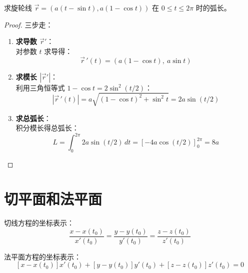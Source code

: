 \documentclass[lang=cn,10pt,thmcnt=section]{elegantbook}
\begin{document}
	\begin{example}
		求旋轮线 $\vec{r} = (a(t - \sin t), a(1 - \cos t))$ 在 $0 \leq t \leq 2\pi$ 时的弧长。
	\end{example}
	\begin{proof}
	三步走：
	\begin{enumerate}
		\item \textbf{求导数 $\overrightarrow{r} '$}：\\
		对参数 $t$ 求导得：
		\[
			\vec{r}\,'(t) = \left( a(1 - \cos t),\ a\sin t \right)
		\]
		
		\item \textbf{求模长 $\left\lvert \overrightarrow{r} '\right\rvert $}：\\
		利用三角恒等式 $1 - \cos t = 2\sin^2(t/2)$：
		\[
			\left\lvert \vec{r}\,'(t) \right\rvert = a\sqrt{(1 - \cos t)^2 + \sin^2 t} = 2a \sin(t/2)
		\]
		
		\item \textbf{求总弧长}：\\
		积分模长得总弧长：
		\[
			L = \int_{0}^{2\pi} 2a \sin(t/2) \,dt = \left[ -4a \cos(t/2) \right]_{0}^{2\pi} = 8a
		\]
	\end{enumerate}
\end{proof}

\section{切平面和法平面}
切线方程的坐标表示：
\[
\frac{x - x(t_0)}{x'(t_0)} = \frac{y - y(t_0)}{y'(t_0)} = \frac{z - z(t_0)}{z'(t_0)}
\]

法平面方程的坐标表示：
\[
[x - x(t_0)] x'(t_0) + [y - y(t_0)] y'(t_0) + [z - z(t_0)] z'(t_0) = 0
\]
\end{document}
